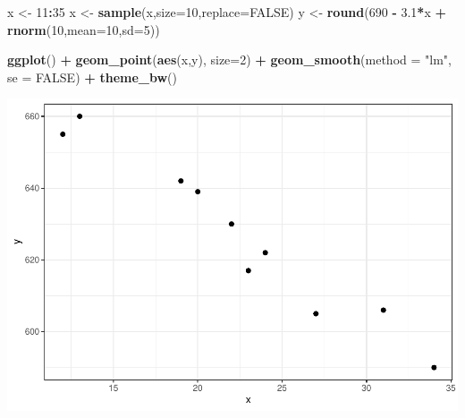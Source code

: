 \documentclass[
]{book}
\newenvironment{Shaded}{\begin{snugshade}}{\end{snugshade}}
\newcommand{\DataTypeTok}[1]{\textcolor[rgb]{0.13,0.29,0.53}{#1}}
\newcommand{\DecValTok}[1]{\textcolor[rgb]{0.00,0.00,0.81}{#1}}
\newcommand{\FloatTok}[1]{\textcolor[rgb]{0.00,0.00,0.81}{#1}}
\newcommand{\KeywordTok}[1]{\textcolor[rgb]{0.13,0.29,0.53}{\textbf{#1}}}
\newcommand{\NormalTok}[1]{#1}
\newcommand{\OperatorTok}[1]{\textcolor[rgb]{0.81,0.36,0.00}{\textbf{#1}}}
\newcommand{\OtherTok}[1]{\textcolor[rgb]{0.56,0.35,0.01}{#1}}
\newcommand{\StringTok}[1]{\textcolor[rgb]{0.31,0.60,0.02}{#1}}
\begin{document}
\begin{Shaded}
\begin{Highlighting}[]
\NormalTok{x <-}\StringTok{ }\DecValTok{11}\OperatorTok{:}\DecValTok{35} 
\NormalTok{x <-}\StringTok{ }\KeywordTok{sample}\NormalTok{(x,}\DataTypeTok{size=}\DecValTok{10}\NormalTok{,}\DataTypeTok{replace=}\OtherTok{FALSE}\NormalTok{)}
\NormalTok{y <-}\StringTok{ }\KeywordTok{round}\NormalTok{(}\DecValTok{690} \OperatorTok{-}\StringTok{ }\FloatTok{3.1}\OperatorTok{*}\NormalTok{x }\OperatorTok{+}\StringTok{ }\KeywordTok{rnorm}\NormalTok{(}\DecValTok{10}\NormalTok{,}\DataTypeTok{mean=}\DecValTok{10}\NormalTok{,}\DataTypeTok{sd=}\DecValTok{5}\NormalTok{))}

\KeywordTok{ggplot}\NormalTok{() }\OperatorTok{+}
\KeywordTok{geom_point}\NormalTok{(}\KeywordTok{aes}\NormalTok{(x,y), }\DataTypeTok{size=}\DecValTok{2}\NormalTok{) }\OperatorTok{+}\StringTok{ }
\KeywordTok{geom_smooth}\NormalTok{(}\DataTypeTok{method =} \StringTok{"lm"}\NormalTok{, }\DataTypeTok{se =} \OtherTok{FALSE}\NormalTok{) }\OperatorTok{+}
\KeywordTok{theme_bw}\NormalTok{()  }
\end{Highlighting}
\end{Shaded}

\includegraphics{Metrics_files/figure-latex/unnamed-chunk-19-2.pdf}

\begin{Shaded}
\end{Shaded}
\end{document}
